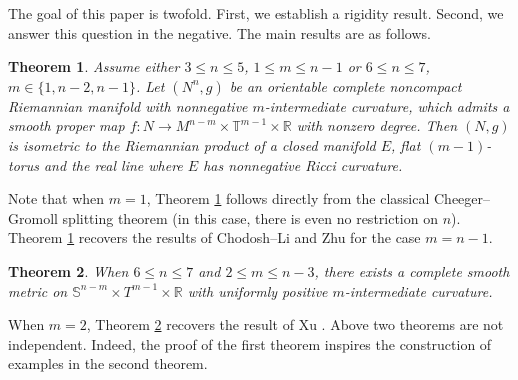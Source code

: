 \documentclass[11pt,letterpaper]{amsart}
\newtheorem{theorem}{Theorem}[section]
\theoremstyle{definition}
\theoremstyle{remark}
\numberwithin{equation}{section}
\begin{document}
The goal of this paper is twofold. First, we establish a rigidity result. Second, we answer this question in the negative. The main results are as follows.

\begin{theorem}\label{splitting of nonnegative C_m: main in the introduction}
Assume either \(3 \leq  n \leq  5\), \(1 \leq  m \leq  n-1\) or \(6 \leq  n \leq  7\), \(m\in \{1,n-2,n-1\}\). Let \((N^n,g)\) be an orientable complete noncompact Riemannian manifold with nonnegative $m$-intermediate curvature, which admits a smooth proper map \(f : N \to M^{n-m}\times \mathbb{T}^{m-1} \times \mathbb{R}\) with nonzero degree. Then \((N,g)\) is isometric to the Riemannian product of a closed manifold $E$, flat $(m-1)$-torus and the real line where $E$ has nonnegative Ricci curvature.
\end{theorem}

 Note that when $m = 1$, Theorem \ref{splitting of nonnegative C_m: main in the introduction} follows directly from the classical Cheeger--Gromoll splitting theorem (in this case, there is even no restriction on $n$). Theorem \ref{splitting of nonnegative C_m: main in the introduction} recovers the results of Chodosh--Li \cite{chodoshlisoapbubble} and Zhu \cite{zhu-splitting} for the case $m = n-1$.
 
 \begin{theorem}\label{counterexample of splitting: main in the introduction}
    When $6\leq n\leq 7$ and $2\leq m\leq n-3$, there exists a complete smooth metric on $\mathbb{S}^{n-m}\times T^{m-1}\times \mathbb{R}$ with uniformly positive $m$-intermediate curvature.
\end{theorem}

When $m=2$, Theorem \ref{counterexample of splitting: main in the introduction} recovers the result of Xu \cite{XuTrans}. Above two theorems are not independent. Indeed, the proof of the first theorem inspires the construction of examples in the second theorem. 
\end{document}
